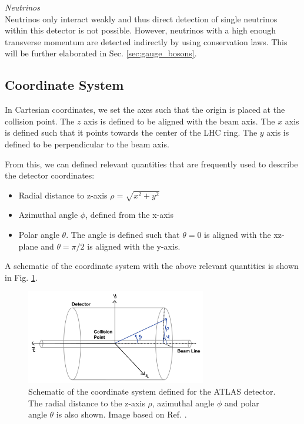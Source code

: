 \documentclass[a4paper]{report}
\numberwithin{equation}{section}
\begin{document}
\noindent \textit{Neutrinos} \\

Neutrinos only interact weakly and thus direct detection of single neutrinos within this detector is not possible. However, neutrinos with a high enough 
transverse momentum are detected indirectly by using conservation laws. This will be further elaborated in Sec. \ref{sec:gauge_bosons}.

\subsection{Coordinate System} 

In Cartesian coordinates, we set the axes such that the origin is placed at the collision point. 
The $z$ axis is defined to be aligned with the beam axis. The $x$ axis is defined such that it 
points towards the center of the LHC ring. The $y$ axis is defined to be perpendicular to the beam axis. 
\par

From this, we can defined relevant quantities that are frequently used to describe the detector coordinates:
\begin{itemize}
	\item Radial distance to z-axis $\rho = \sqrt{x^2 + y^2}$ 
	\item Azimuthal angle $\phi$, defined from the x-axis 
	\item Polar angle $\theta$. The angle is defined such that $\theta = 0$ is aligned with the xz-plane and $\theta = \pi / 2$ is 
			aligned with the y-axis. 
\end{itemize}
A schematic of the coordinate system with the above relevant quantities is shown in Fig. \ref{fig:atlas_coord}.

\begin{figure}[htpb]
    \centering
    \includegraphics[width=0.7\textwidth]{atlas_coords.png}
    \caption{Schematic of the coordinate system defined for the ATLAS detector. The radial distance to the z-axis $\rho$, 
	azimuthal angle $\phi$ and polar angle $\theta$ is also shown. Image based on Ref. \cite{Rivera2018}.}
    \label{fig:atlas_coord}
\end{figure}
\end{document}
